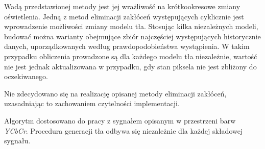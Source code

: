 Wadą przedstawionej metody jest jej wrażliwość na krótkookresowe zmiany oświetlenia. Jedną z metod eliminacji zakłóceń występujących cyklicznie jest wprowadzenie możliwości zmiany modelu tła. Stosując kilka niezależnych modeli, budować można warianty obejmujące zbiór najczęściej występujących historycznie danych, uporządkowanych według prawdopodobieństwa wystąpienia. W takim przypadku obliczenia prowadzone są dla każdego modelu tła niezależnie, wartość nie jest jednak aktualizowana w przypadku, gdy stan piksela nie jest zbliżony do oczekiwanego.

Nie zdecydowano się na realizację opisanej metody eliminacji zakłóceń, uzasadniając to zachowaniem czytelności implementacji.

Algorytm dostosowano do pracy z sygnałem opisanym w przestrzeni barw \textit{YCbCr}. Procedura generacji tła odbywa się niezależnie dla każdej składowej sygnału.

